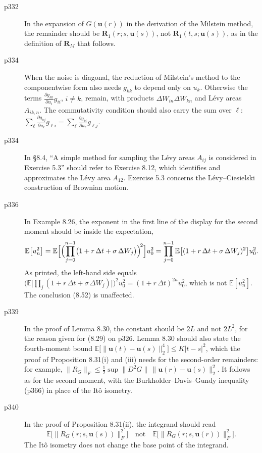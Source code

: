 \documentclass[final]{article}
\theoremstyle{definition}
\newcommand{\vecbs}[1]{\boldsymbol{#1}}
\renewcommand{\vec}[1]{{\vecbs{#1}}}
\begin{document}
\begin{enumerate}
\begin{description}
   \item[p332] In the expansion of $G(\vec u(r))$ in the derivation of the Milstein
method, the remainder should be $\vec R_1(r;s,\vec u(s))$, not
$\vec R_1(t,s;\vec u(s))$, as in the definition of $\vec R_M$ that follows.
   \item[p334] When the noise is diagonal, the reduction of Milstein's method
to the componentwise form also needs $g_{kk}$ to depend only on $u_k$. Otherwise
the terms $\frac{\partial g_{kk}}{\partial u_i}g_{ii}$, $i\ne k$, remain, with
products $\Delta W_{in}\Delta W_{kn}$ and L\'evy areas $A_{ik,n}$. The commutativity
condition should also carry the sum over $\ell$:
$\sum_{\ell}\frac{\partial g_{kj}}{\partial u_\ell}g_{\ell i}
=\sum_{\ell}\frac{\partial g_{ki}}{\partial u_\ell}g_{\ell j}$.
   \item[p334] In \S8.4, ``A simple method for sampling the L\'evy areas
$A_{ij}$ is considered in Exercise 5.3'' should refer to Exercise 8.12, which
identifies and approximates the L\'evy area $A_{12}$. Exercise 5.3 concerns the
L\'evy--Ciesielski construction of Brownian motion.
   \item[p336] In Example 8.26, the exponent in the first line of the display
for the second moment should be inside the expectation,
\[
\mathbb{E}\bigl[u_n^2\bigr]
=\mathbb{E}\Bigl[\Bigl(\prod_{j=0}^{n-1}
\bigl(1+r\,\Delta t+\sigma\,\Delta W_j\bigr)\Bigr)^{\!2}\Bigr]u_0^2
=\prod_{j=0}^{n-1}\mathbb{E}\bigl[(1+r\,\Delta t+\sigma\,\Delta W_j)^2\bigr]u_0^2 .
\]
As printed, the left-hand side equals
$\bigl(\mathbb{E}\bigl[\prod_j(1+r\,\Delta t+\sigma\,\Delta W_j)\bigr]\bigr)^2u_0^2
=(1+r\,\Delta t)^{2n}u_0^2$, which is not $\mathbb{E}[u_n^2]$. The conclusion
(8.52) is unaffected.
   \item[p339] In the proof of Lemma 8.30, the constant should be $2L$ and not
$2L^2$, for the reason given for (8.29) on p326. Lemma 8.30 should also state the
fourth-moment bound
$\mathbb{E}\bigl[\|\vec u(t)-\vec u(s)\|_2^4\bigr]\le K|t-s|^2$, which the proof
of Proposition 8.31(i) and (iii) needs for the second-order remainders: for
example, $\|R_G\|_F\le\frac12\sup\|D^2G\|\,\|\vec u(r)-\vec u(s)\|_2^2$. It
follows as for the second moment, with the Burkholder--Davis--Gundy inequality
(p366) in place of the It\^o isometry.
   \item[p340] In the proof of Proposition 8.31(ii), the integrand should read
\[
\mathbb{E}\bigl[\|R_{G}(r;s,\vec{u}(s))\|_{F}^{2}\bigr]
\quad\text{not}\quad
\mathbb{E}\bigl[\|R_{G}(r;s,\vec{u}(r))\|_{F}^{2}\bigr].
\]
The It\^o isometry does not change the base point of the integrand.

\end{description}
\end{enumerate}
\end{document}
